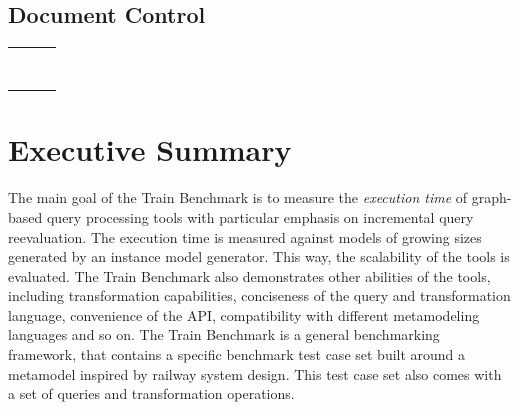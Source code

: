 \documentclass[12pt,twoside,a4paper]{report}
\begin{document}
\firstpage

\partnerpage


\newpage
\tableofcontents

\newpage
\section*{Document Control}

\begin{tabular}{*{3}{|p{.3\textwidth}}|}\hline
{} &
 &
\tabularnewline\hline
{} &  &  \tabularnewline\hline
{} &  &  \tabularnewline\hline
{} &  &  \tabularnewline\hline
{} &  &  \tabularnewline\hline
{} &  &  \tabularnewline\hline
{} &  &  \tabularnewline\hline
{} &  &  \tabularnewline\hline
\end{tabular}

\clearpage
{}

\chapter*{Executive Summary}
The main goal of the Train Benchmark is to measure the \emph{execution time} of graph-based query processing tools with particular emphasis on incremental query reevaluation. The execution time is measured against models of growing sizes generated by an instance model generator. This way, the scalability of the tools is evaluated. The Train Benchmark also demonstrates other abilities of the tools, including transformation capabilities, conciseness of the query and transformation language, convenience of the API, compatibility with different metamodeling languages and so on. The Train Benchmark is a general benchmarking framework, that contains a specific benchmark test case set built around a metamodel inspired by railway system design. This test case set also comes with a set of queries and transformation operations. 
\end{document}
